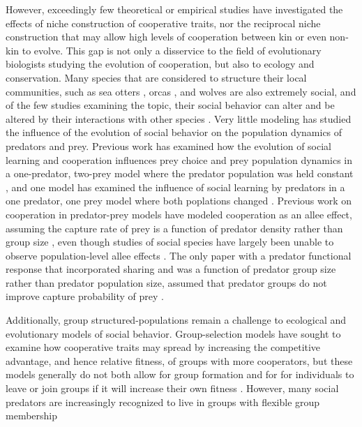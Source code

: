 However, exceedingly few theoretical or empirical studies have investigated the effects of niche construction of cooperative traits, nor the reciprocal niche construction that may allow high levels of cooperation between kin or even non-kin to evolve. This gap is not only a disservice to the field of evolutionary biologists studying the evolution of cooperation, but also to ecology and conservation. Many species that are considered to structure their local communities, such as sea otters  \cite{estes_killer_1998, estes_sea_2016}, orcas \cite{estes_killer_1998, valls_keystone_2015}, and wolves \cite{c_eisenberg_wolfs_2013} are also extremely social, and of the few studies examining the topic, their social behavior can alter and be altered by their interactions with other species \cite{jordaan_effect_2023, imbert_why_2016, foster_social_2012}. Very little modeling has studied the influence of the evolution of social behavior on the population dynamics of predators and prey. Previous work has examined how the evolution of social learning and cooperation influences prey choice and prey population dynamics in a one-predator, two-prey model where the predator population was held constant \cite{borofsky_static_2022, borofsky_success-biased_2022, borofsky_cultural_2024}, and one model has examined the influence of social learning by predators in a one predator, one prey model where both poplations changed \cite{kikuchi_social_2023}. Previous work on cooperation in predator-prey models have modeled cooperation as an allee effect, assuming the capture rate of prey is a function of predator density rather than group size \cite{berec_impacts_2010, teixeira_alves_hunting_2017}, even though studies of social species have largely been unable to observe population-level allee effects \cite{lerch_why_2018}. The only paper with a predator functional response that incorporated sharing and  was a function of predator group size rather than predator population size, assumed that predator groups do not improve capture probability of prey \cite{fryxell_group_2007}.

Additionally, group structured-populations remain a challenge to ecological and evolutionary models of social behavior. Group-selection models have sought to examine how cooperative traits may spread by increasing the competitive advantage, and hence relative fitness, of groups with more cooperators, but these models generally do not both allow for group formation and for for individuals to leave or join groups if it will increase their own fitness \cite{traulsen_evolution_2006, simon_towards_2013}. However, many social predators are increasingly recognized to live in groups with flexible group membership \cite{smith_social_2008, } 


